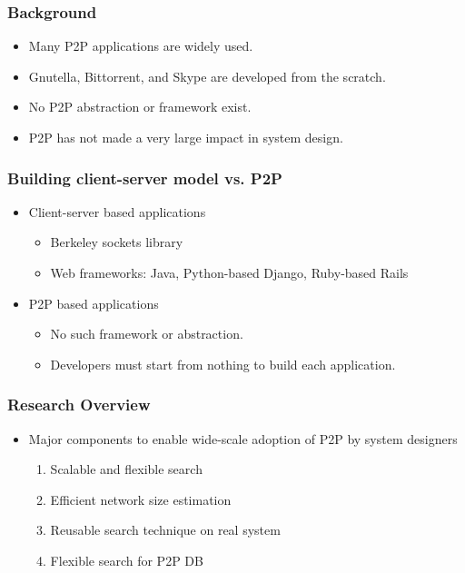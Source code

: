\documentclass[red]{beamer}
\begin{document}
\begin{frame}
\frametitle{Background}
\begin{itemize}
\item Many P2P applications are widely used.
\item Gnutella, Bittorrent, and Skype are developed from the scratch.
\item No P2P abstraction or framework exist.
\item P2P has not made a very large impact in system design.
\end{itemize}
\end{frame}
\begin{frame}
\frametitle{Building client-server model vs. P2P}
\begin{itemize}
\item Client-server based applications
\begin{itemize}
\item Berkeley sockets library
\item Web frameworks: Java, Python-based Django, Ruby-based Rails
\end{itemize}
\item P2P based applications
\begin{itemize}
\item No such framework or abstraction.
\item Developers must start from nothing to build each application. 
\end{itemize}
\end{itemize}
\end{frame}
\begin{frame}
\frametitle{Research Overview}
\begin{itemize}
\item Major components to enable wide-scale adoption of P2P by system designers
\begin{enumerate}
\item Scalable and flexible search
\item Efficient network size estimation
\item Reusable search technique on real system
\item Flexible search for P2P DB
\end{enumerate}
\end{itemize}
\end{frame}
\end{document}
